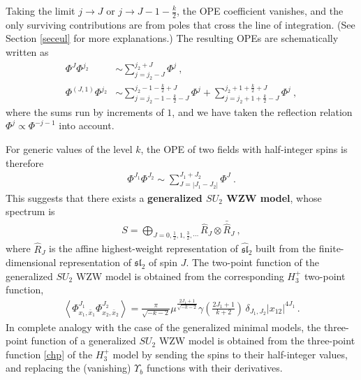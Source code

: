 \documentclass[12pt, a4paper, notitlepage, twoside]{report}
\numberwithin{equation}{section}
\theoremstyle{break}
\begin{document}
Taking the limit $j\to J$ or $j\to J-1-\frac{k}{2}$, the OPE coefficient vanishes, and the only surviving contributions are from poles that cross the line of integration. (See Section \ref{seceul} for more explanations.) The resulting OPEs are schematically written as 
\begin{align}
 \Phi^J \Phi^{j_2} & \sim \sum_{j=j_2-J}^{j_2+J} \Phi^j \ ,
\label{pjp}
\\
\Phi^{(J,1)}\Phi^{j_2} & \sim \sum_{j=j_2-1-\frac{k}{2}-J}^{j_2-1-\frac{k}{2}+J} \Phi^j + \sum_{j=j_2+1+\frac{k}{2}-J}^{j_2+1+\frac{k}{2}+J} \Phi^j\ ,
\label{pjop}
\end{align}
where the sums run by increments of $1$, and we have taken the reflection relation $\Phi^j\propto \Phi^{-j-1}$ into account. 

For generic values of the level $k$, the OPE of two fields with half-integer spins is therefore 
\begin{align}
 \boxed{\Phi^{J_1}\Phi^{J_2} \sim \sum_{J=|J_1-J_2|}^{J_1+J_2} \Phi^J}\ .
\end{align}
This suggests that there exists a \textbf{\boldmath generalized $SU_2$ WZW model}, whose spectrum is 
\begin{align}
 \boxed{S = \bigoplus_{J=0,\frac12,1,\frac32,\cdots} \hat{R}_J \otimes \bar{\hat{R}}_J}\ ,
\end{align}
where $\hat{R}_J$ is the affine highest-weight representation of $\widehat{\mathfrak{sl}}_2$ built from the finite-dimensional representation of $\mathfrak{sl}_2$ of spin $J$.
The two-point function of the generalized $SU_2$ WZW model is obtained from the corresponding $H_3^+$ two-point function, 
\begin{align}
 \left\langle \Phi^{J_1}_{x_1,\bar{x}_1} \Phi^{J_2}_{x_2,\bar{x}_2} \right\rangle = \frac{\pi}{\sqrt{-k-2}}\mu^{\frac{2J_1+1}{\sqrt{-k-2}}} \gamma(\tfrac{2J_1+1}{k+2})\, \delta_{J_1,J_2}|x_{12}|^{4J_1}\, .
\label{pjpjd}
\end{align}
In complete analogy with the case of the generalized minimal models, the three-point function of a generalized $SU_2$ WZW model is obtained from the three-point function \eqref{chp} of the $H_3^+$ model by sending the spins to their half-integer values, and replacing the (vanishing) $\Upsilon_b$ functions with their derivatives. 
\end{document}
